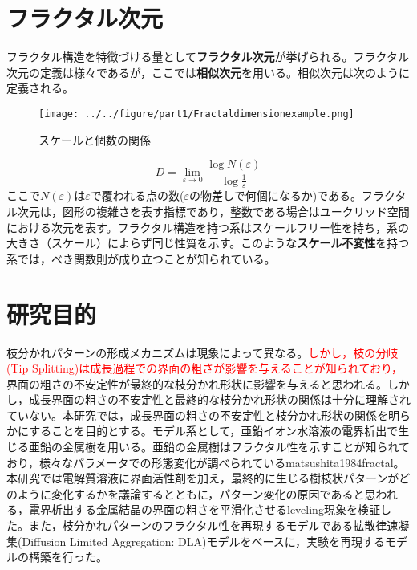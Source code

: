 \documentclass[autodetect-engine,dvi=dvipdfmx,a4paper,ja=standard,oneside,openany,11pt,draft]{bxjsbook}
\begin{document}
\section{フラクタル次元}
フラクタル構造を特徴づける量として\textbf{フラクタル次元}が挙げられる。フラクタル次元の定義は様々であるが，ここでは\textbf{相似次元}を用いる。相似次元は次のように定義される。
\begin{wrapfigure}{r}[0pt]{0.33\textwidth}
  \begin{center}
    \texttt{[image: ../../figure/part1/Fractaldimensionexample.png]}
  \end{center}
  \caption{スケールと個数の関係\cite{}}
  \label{fig:相似次元の考え方}
\end{wrapfigure}
\begin{equation}
  D=\lim_{\varepsilon \to 0}\frac{\log N(\varepsilon)}{\log \frac{1}{\varepsilon}}
\end{equation}
ここで$N(\varepsilon)$は$\varepsilon$で覆われる点の数($\varepsilon$の物差しで何個になるか)である。フラクタル次元は，図形の複雑さを表す指標であり，整数である場合はユークリッド空間における次元を表す。フラクタル構造を持つ系はスケールフリー性を持ち，系の大きさ（スケール）によらず同じ性質を示す。このような\textbf{スケール不変性}を持つ系では，べき関数則が成り立つことが知られている。
\section{研究目的}
枝分かれパターンの形成メカニズムは現象によって異なる。\textcolor{red}{しかし，枝の分岐(Tip Splitting)は成長過程での界面の粗さが影響を与える\cite{}ことが知られており，}界面の粗さの不安定性が最終的な枝分かれ形状に影響を与えると思われる。しかし，成長界面の粗さの不安定性と最終的な枝分かれ形状の関係は十分に理解されていない。本研究では，成長界面の粗さの不安定性と枝分かれ形状の関係を明らかにすることを目的とする。モデル系として，亜鉛イオン水溶液の電界析出で生じる亜鉛の金属樹を用いる。亜鉛の金属樹はフラクタル性を示すことが知られており\cite{matsushita1984fractal}，様々なパラメータでの形態変化が調べられている\cite{suda2003temperature}{matsushita1984fractal}。本研究では電解質溶液に界面活性剤を加え，最終的に生じる樹枝状パターンがどのように変化するかを議論するとともに，パターン変化の原因であると思われる，電界析出する金属結晶の界面の粗さを平滑化させるleveling現象を検証した。また，枝分かれパターンのフラクタル性を再現するモデルである拡散律速凝集(Diffusion Limited Aggregation: DLA)モデル\cite{witten1981diffusion}をベースに，実験を再現するモデルの構築を行った。

\ifdraft{
  
  
}{}
\end{document}
